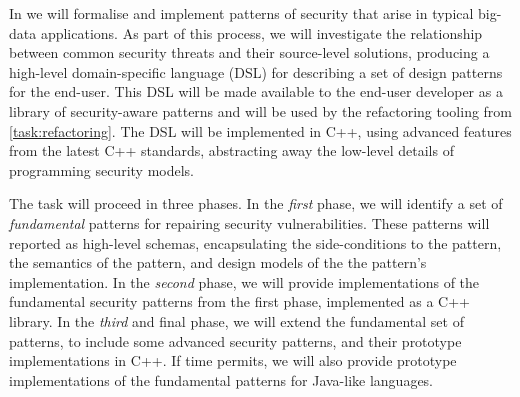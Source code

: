 \begin{Workpackage}{\thewpno}
\begin{Task}
	\TaskResults{%
	}
	\TaskHeader{}
	
In \theTask{} we will formalise and implement patterns of security that arise in typical big-data applications. As part of this process, we will investigate the relationship between common security threats and their source-level solutions, producing a high-level domain-specific language (DSL) for describing a set of design patterns for the end-user. This DSL will be made available to the end-user developer as a library of security-aware patterns and will be used by the refactoring tooling from \ref{task:refactoring}. The DSL will be implemented in C++, using advanced features from the latest C++ standards, abstracting away the low-level details of programming security models.

The task will proceed in three phases. In the \emph{first} phase, we will identify a set of \emph{fundamental} patterns for repairing security vulnerabilities. These patterns will reported as high-level schemas, encapsulating the side-conditions to the pattern, the semantics of the pattern, and design models of the the pattern's implementation.
In the \emph{second} phase, we will provide implementations of the fundamental security patterns from the first phase, implemented as a C++ library. In the \emph{third} and final phase, we will extend the fundamental set of patterns, to include some advanced security patterns, and their prototype implementations in C++. If time permits, we will also provide prototype implementations of the fundamental patterns for Java-like languages. 
\end{Task}

\begin{Task}
	\TaskResults{%
	}
	\TaskHeader{}
	

\end{Task}
\end{Workpackage}
